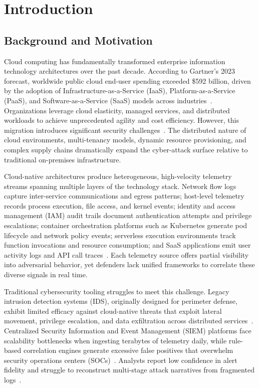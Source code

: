 \chapter{Introduction}\label{chap:intro}
\section{Background and Motivation}\label{sec:intro-background}
Cloud computing has fundamentally transformed enterprise information technology architectures over the past decade. According to Gartner's 2023 forecast, worldwide public cloud end-user spending exceeded \$592 billion, driven by the adoption of Infrastructure-as-a-Service (IaaS), Platform-as-a-Service (PaaS), and Software-as-a-Service (SaaS) models across industries~\cite{gartner2023cloud}. Organizations leverage cloud elasticity, managed services, and distributed workloads to achieve unprecedented agility and cost efficiency. However, this migration introduces significant security challenges~\cite{hashizume2013analysis}. The distributed nature of cloud environments, multi-tenancy models, dynamic resource provisioning, and complex supply chains dramatically expand the cyber-attack surface relative to traditional on-premises infrastructure.

Cloud-native architectures produce heterogeneous, high-velocity telemetry streams spanning multiple layers of the technology stack. Network flow logs capture inter-service communications and egress patterns; host-level telemetry records process execution, file access, and kernel events; identity and access management (IAM) audit trails document authentication attempts and privilege escalations; container orchestration platforms such as Kubernetes generate pod lifecycle and network policy events; serverless execution environments track function invocations and resource consumption; and SaaS applications emit user activity logs and API call traces~\cite{awscloudtrail2023,opentelemetry2023}. Each telemetry source offers partial visibility into adversarial behavior, yet defenders lack unified frameworks to correlate these diverse signals in real time.

Traditional cybersecurity tooling struggles to meet this challenge. Legacy intrusion detection systems (IDS), originally designed for perimeter defense, exhibit limited efficacy against cloud-native threats that exploit lateral movement, privilege escalation, and data exfiltration across distributed services~\cite{chandola2009anomaly}. Centralized Security Information and Event Management (SIEM) platforms face scalability bottlenecks when ingesting terabytes of telemetry daily, while rule-based correlation engines generate excessive false positives that overwhelm security operations centers (SOCs)~\cite{zhang2022ids}. Analysts report low confidence in alert fidelity and struggle to reconstruct multi-stage attack narratives from fragmented logs~\cite{darpa2020xai}.

